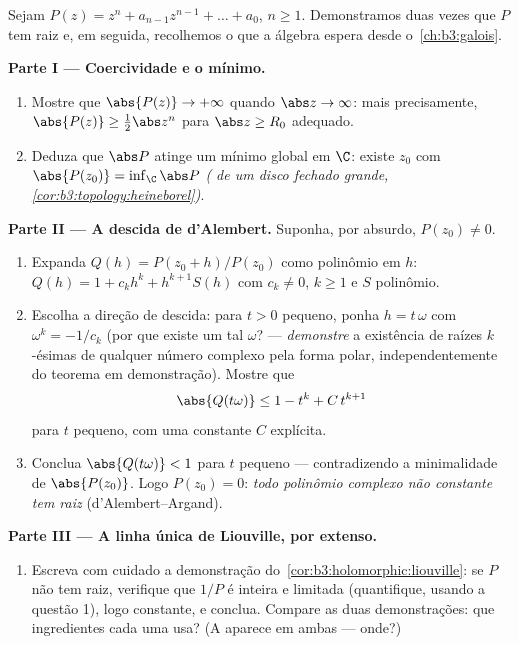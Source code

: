 \begin{problem}\label{pb:b3:holomorphic:1}
Sejam $P(z) = z^n + a_{n-1}z^{n-1} + \dots + a_0$, $n \geq 1$. Demonstramos duas vezes que $P$ tem raiz e, em
seguida, recolhemos o que a álgebra espera desde o~\cref{ch:b3:galois}.

\medskip
\noindent\textbf{Parte I --- Coercividade e o mínimo.}
\begin{enumerate}
  \item Mostre que $\abs{P(z)} \to +\infty$ quando $\abs z \to
        \infty$: mais precisamente, $\abs{P(z)} \geq \frac12\abs z^n$ para
        $\abs z \geq R_0$ adequado.
  \item Deduza que $\abs P$ atinge um mínimo global em $\C$:
        existe $z_0$ com $\abs{P(z_0)} = \inf_\C\abs P$ \emph{( de um disco fechado
        grande, \cref{cor:b3:topology:heineborel})}.
\end{enumerate}

\medskip
\noindent\textbf{Parte II --- A descida de d'Alembert.} Suponha, por
absurdo, $P(z_0) \neq 0$.
\begin{enumerate}[resume]
  \item Expanda $Q(h) = P(z_0 + h)/P(z_0)$ como polinômio em $h$: $Q(h) = 1 + c_kh^k + h^{k+1}S(h)$ com $c_k \neq
        0$, $k \geq 1$ e
        $S$ polinômio.
  \item Escolha a direção de descida: para $t > 0$ pequeno, ponha
        $h = t\,\omega$ com $\omega^k = -1/c_k$ (por que existe um tal $\omega$? ---
        \emph{demonstre} a existência de raízes $k$-ésimas de
        qualquer número complexo pela forma polar, independentemente do
        teorema em demonstração). Mostre que
        \[
        \abs{Q(t\omega)} \leq 1 - t^k + C\,t^{k+1}
        \]
        para $t$ pequeno, com uma constante $C$ explícita.
  \item Conclua $\abs{Q(t\omega)} < 1$ para $t$ pequeno --- contradizendo a
        minimalidade de $\abs{P(z_0)}$. Logo $P(z_0) = 0$: \emph{todo polinômio complexo
        não constante tem raiz} (d'Alembert--Argand).
\end{enumerate}

\medskip
\noindent\textbf{Parte III --- A linha única de Liouville, por
extenso.}
\begin{enumerate}[resume]
  \item Escreva com cuidado a demonstração do~\cref{cor:b3:holomorphic:liouville}: se
        $P$ não tem raiz, verifique que $1/P$ é inteira e
        limitada (quantifique, usando a questão 1), logo constante, e
        conclua. Compare as duas demonstrações: que ingredientes cada
        uma usa? (A  aparece em ambas --- onde?)
\end{enumerate}


\end{problem}
